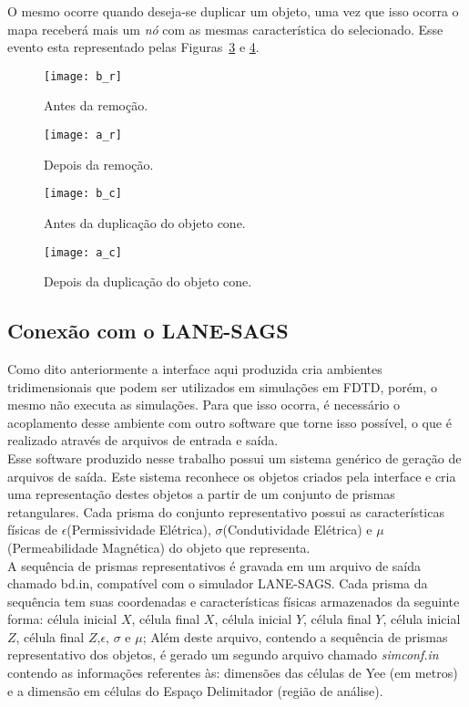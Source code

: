 	O mesmo ocorre quando deseja-se duplicar um objeto, uma vez que isso ocorra o mapa receberá mais um \textit{nó} com as mesmas característica do selecionado. Esse evento esta representado pelas Figuras~\ref{fg:b_c} e \ref{fg:a_c}.
	
\begin{figure}[ht!]
	\centering
	\texttt{[image: b\_r]}
	\caption{Antes da remoção.}
	\label{fg:b_r}
\end{figure}
\begin{figure}[ht!]
	\centering
	\texttt{[image: a\_r]}
	\caption{Depois da remoção.}
	\label{fg:a_r}
\end{figure}
\begin{figure}[ht!]
	\centering
	\texttt{[image: b\_c]}
	\caption{Antes da duplicação do objeto cone.}
	\label{fg:b_c}
\end{figure}
\begin{figure}[ht!]
	\centering
	\texttt{[image: a\_c]}
	\caption{Depois da duplicação do objeto cone.}
	\label{fg:a_c}
\end{figure}

	\subsection{Conexão com o LANE-SAGS}
Como dito anteriormente a interface aqui produzida cria ambientes tridimensionais que podem ser utilizados em simulações em FDTD, porém, o mesmo não executa as simulações. Para que isso ocorra, é necessário o acoplamento desse ambiente com outro software que torne isso possível, o que é realizado através de arquivos de entrada e saída.\\
	
Esse software produzido nesse trabalho possui um sistema genérico de geração de arquivos de saída. Este sistema reconhece os objetos criados pela interface e cria uma representação destes objetos a partir de um conjunto de prismas retangulares. Cada prisma do conjunto representativo possui as características físicas de $\epsilon$(Permissividade Elétrica), $\sigma$(Condutividade Elétrica) e $\mu$(Permeabilidade Magnética) do objeto que representa.\\

A sequência de prismas representativos é gravada em um arquivo de saída chamado bd.in, compatível com o simulador LANE-SAGS. Cada prisma da sequência tem suas coordenadas e características físicas armazenados da seguinte forma: célula inicial $X$, célula final $X$, célula inicial $Y$, célula final $Y$, célula inicial $Z$, célula final $Z$,$\epsilon$, $\sigma$ e $\mu$; Além deste arquivo, contendo a sequência de prismas representativo dos objetos, é gerado um segundo arquivo chamado \textit{simconf.in} contendo as informações referentes às: dimensões das células de Yee (em metros) e a dimensão em células do Espaço Delimitador (região de análise).\\

